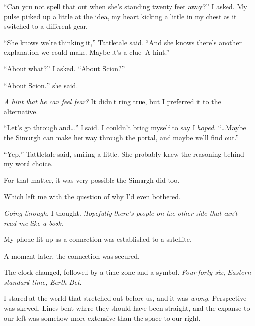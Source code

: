 ``Can you not spell that out when she's standing twenty feet away?'' I asked.  My pulse picked up a little at the idea, my heart kicking a little in my chest as it switched to a different gear.



``She knows we're thinking it,'' Tattletale said.  ``And she knows there's another explanation we could make.  Maybe it's a clue.  A hint.''



``About what?'' I asked.  ``About Scion?''



``About Scion,'' she said.



\emph{A hint that he can feel fear?}  It didn't ring true, but I preferred it to the alternative.



``Let's go through and\ldots'' I said.  I couldn't bring myself to say I \emph{hoped}.  ``\ldots{}Maybe the Simurgh can make her way through the portal, and maybe we'll find out.''



``Yep,'' Tattletale said, smiling a little.  She probably knew the reasoning behind my word choice.



For that matter, it was very possible the Simurgh did too.



Which left me with the question of why I'd even bothered.



\emph{Going through}, I thought.  \emph{Hopefully there's people on the other side that can't read me like a book.}



My phone lit up as a connection was established to a satellite.



A moment later, the connection was secured.



The clock changed, followed by a time zone and a symbol.  \emph{Four forty-six, Eastern standard time, Earth Bet}.



I stared at the world that stretched out before us, and it was \emph{wrong}.  Perspective was skewed.  Lines bent where they should have been straight, and the expanse to our left was somehow more extensive than the space to our right.



